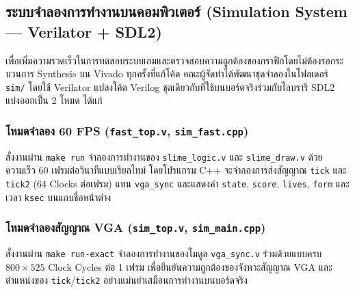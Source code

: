 \clearpage
\subsection{ระบบจำลองการทำงานบนคอมพิวเตอร์ (Simulation System — Verilator + SDL2)}

เพื่อเพิ่มความรวดเร็วในการทดสอบระบบเกมและตรวจสอบความถูกต้องของกราฟิกโดยไม่ต้องรอกระบวนการ Synthesis บน Vivado ทุกครั้งที่แก้โค้ด คณะผู้จัดทำได้พัฒนาชุดจำลองในโฟลเดอร์ \texttt{sim/} โดยใช้ Verilator แปลงโค้ด Verilog ชุดเดียวกับที่ใช้บนบอร์ดจริงร่วมกับไลบรารี SDL2 แบ่งออกเป็น 2 โหมด ได้แก่

\subsubsection{โหมดจำลอง 60 FPS (\texttt{fast\_top.v}, \texttt{sim\_fast.cpp})}

สั่งงานผ่าน \texttt{make run} จำลองการทำงานของ \texttt{slime\_logic.v} และ \texttt{slime\_draw.v} ด้วยความเร็ว 60 เฟรมต่อวินาทีแบบเรียลไทม์ โดยโปรแกรม C++ จะจำลองการส่งสัญญาณ \texttt{tick} และ \texttt{tick2} (64 Clocks ต่อเฟรม) แทน \texttt{vga\_sync} และแสดงค่า \texttt{state}, \texttt{score}, \texttt{lives}, \texttt{form} และเวลา \texttt{ksec} บนแถบชื่อหน้าต่าง

\subsubsection{โหมดจำลองสัญญาณ VGA (\texttt{sim\_top.v}, \texttt{sim\_main.cpp})}

สั่งงานผ่าน \texttt{make run-exact} จำลองการทำงานของโมดูล \texttt{vga\_sync.v} ร่วมด้วยแบบครบ $800\times525$ Clock Cycles ต่อ 1 เฟรม เพื่อยืนยันความถูกต้องของจังหวะสัญญาณ VGA และตำแหน่งของ \texttt{tick}/\texttt{tick2} อย่างแม่นยำเสมือนการทำงานบนบอร์ดจริง
